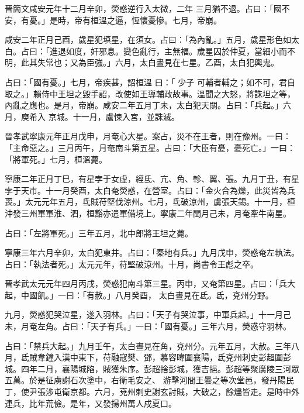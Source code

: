 
\begin{pinyinscope}

 晉簡文咸安元年十二月辛卯，熒惑逆行入太微，二年
 三月猶不退。占曰：「國不安，有憂。」是時，帝有桓溫之逼，恆懷憂慘。七月，帝崩。



 咸安二年正月己酉，歲星犯填星，在須女。占曰：「為內亂。」五月，歲星形色如太白。占曰：「進退如度，奸邪息。變色亂行，主無福。歲星囚於仲夏，當細小而不明，此其失常也；又為臣強。」六月，太白晝見在七星。乙酉，太白犯輿鬼。



 占曰：「國有憂。」七月，帝疾甚，詔桓溫
 曰：「
 少子
 可輔者輔之；如不可，君自取之。」賴侍中王坦之毀手詔，改使如王導輔政故事。溫聞之大怒，將誅坦之等，內亂之應也。是月，帝崩。咸安二年五月丁未，太白犯天關。占曰：「兵起。」六月，庾希入
 京城。十一月，盧悚入宮，並誅滅。



 晉孝武寧康元年正月戊申，月奄心大星。案占，災不在王者，則在豫州。一曰：「主命惡之。」三月丙午，月奄南斗第五星。占曰：「大臣有憂，憂死亡。」一曰：「將軍死。」七月，桓溫薨。



 寧康二年正月丁巳，有星孛于女虛，經氐、亢、角、軫、翼、張。九月丁丑，有星孛于天市。十一月癸酉，太白奄熒惑，在營室。占曰：「金火合為爍，此災皆為兵喪。」太元元年五月，氐賊苻堅伐涼州。七月，氐破涼州，虜張天錫。十一月，桓
 沖發三州軍軍淮、泗，桓豁亦遣軍備境上。寧康二年閏月己未，月奄牽牛南星。



 占曰：「左將軍死。」三年五月，北中郎將王坦之薨。



 寧康三年六月辛卯，太白犯東井。占曰：「秦地有兵。」九月戊申，熒惑奄左執法。占曰：「執法者死。」太元元年，苻堅破涼州。十月，尚書令王彪之卒。



 晉孝武太元元年四月丙戌，熒惑犯南斗第三星。丙申，又奄第四星。占曰：「兵大起，中國飢。」一曰：「有赦。」八月癸酉，
 太白晝見在氐。氐，兗州分野。



 九月，熒惑犯哭泣星，遂入羽林。占曰：「天子有哭泣事，中軍兵起。」十一月己未，月奄左角。占曰：「天子有兵。」一曰：「國有憂。」三年六月，熒惑守羽林。



 占曰：「禁兵大起。」九月壬午，太白晝見在角，兗州分。元年五月，大赦。三年八月，氐賊韋鐘入漢中東下，苻融寇樊、鄧，慕容暐圍襄陽，氐兗州刺史彭超圍彭城。四年二月，襄陽城陷，賊獲朱序。彭超捨彭城，獲吉挹。彭超等聚廣陵三河眾五萬。於是征虜謝石次塗中，右衛毛安之、
 游擊河間王曇之等次堂邑，發丹陽民丁，使尹張涉屯衛京都。六月，兗州刺史謝玄討賊，大破之，餘燼皆走。是時中外連兵，比年荒儉。是年，又發揚州萬人戍夏口。




\end{pinyinscope}
